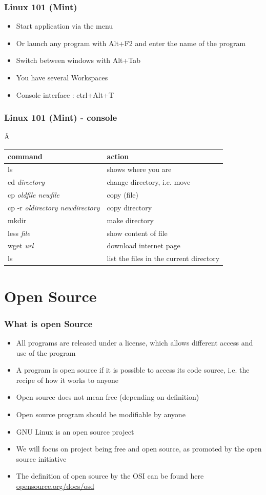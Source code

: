 \documentclass{beamer}
\begin{document}
\begin{frame}
\frametitle{Linux 101 (Mint)}
\begin{itemize}
\item Start application via the menu 
\item Or launch any program with Alt+F2 and enter the name of the program
\item Switch between windows with Alt+Tab
\item You have several Workspaces
\item Console interface : ctrl+Alt+T
\end{itemize}
\end{frame}

\begin{frame}
\frametitle{Linux 101 (Mint) - console}Â
\begin{tabular}{|l|l|}
\hline
command & action \\
\hline
ls & shows where you are \\
cd \textit{directory}& change directory, i.e. move\\
cp \textit{oldfile newfile} & copy (file) \\
cp -r \textit{oldirectory newdirectory}& copy directory\\
mkdir \textit{}& make directory\\
less \textit{file}& show content of file \\
wget \textit{url} & download internet page \\
ls & list the files in the current directory\\
\hline
\end{tabular}
\end{frame}

\section{Open Source}

\begin{frame}
\frametitle{What is open Source}
\begin{itemize}
\item All programs are released under a license, which allows different access and use of the program
\item A program is open source if it is possible to access its code source, i.e. the recipe of how it works to anyone
\item Open source does not mean free (depending on definition)
\item Open source program should be modifiable by anyone 
\item GNU Linux is an open source project
\item We will focus on project being free and open source, as promoted by the open source initiative
\item The definition of open source by the OSI can be found here \url{opensource.org/docs/osd}
\end{itemize}
\end{frame}
\end{document}
